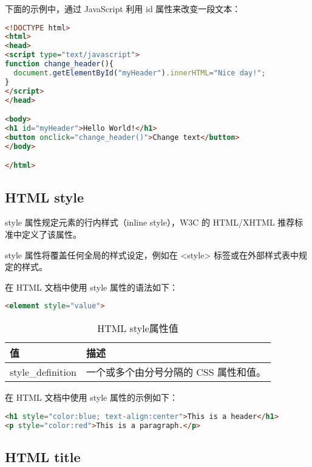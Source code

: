 下面的示例中，通过 JavaScript 利用 id 属性来改变一段文本：

\begin{lstlisting}[language=HTML]
<!DOCTYPE html>
<html>
<head>
<script type="text/javascript">
function change_header(){
  document.getElementById("myHeader").innerHTML="Nice day!";
}
</script>
</head>

<body>
<h1 id="myHeader">Hello World!</h1>
<button onclick="change_header()">Change text</button>
</body>

</html>
\end{lstlisting}

\clearpage



\subsection{HTML style}

style 属性规定元素的行内样式（inline style），W3C 的 HTML/XHTML 推荐标准中定义了该属性。

style 属性将覆盖任何全局的样式设定，例如在 <style> 标签或在外部样式表中规定的样式。


在 HTML 文档中使用 style 属性的语法如下：

\begin{lstlisting}[language=HTML]
<element style="value">
\end{lstlisting}

\begin{table}[!h]
\centering
\vspace{-10pt}
\caption{HTML style属性值}
\label{html_style_attribute}
\begin{tabular}{|m{80pt}|m{290pt}|}
\hline
值	&描述\\
\hline
style\_definition	&一个或多个由分号分隔的 CSS 属性和值。\\
\hline
\end{tabular}
\end{table}

在 HTML 文档中使用 style 属性的示例如下：

\begin{lstlisting}[language=HTML]
<h1 style="color:blue; text-align:center">This is a header</h1>
<p style="color:red">This is a paragraph.</p>
\end{lstlisting}

\clearpage

\subsection{HTML title}

